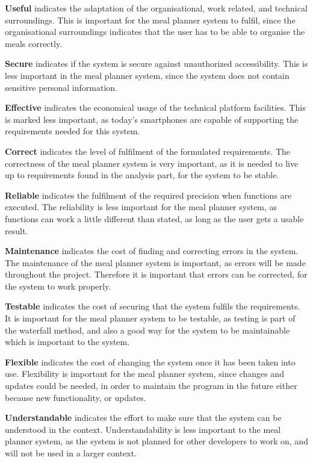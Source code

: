 \textbf{Useful} indicates the adaptation of the organisational, work related, and technical surroundings. This is important for the meal planner system to fulfil, since the organisational surroundings indicates that the user has to be able to organise the meals correctly.

\textbf{Secure} indicates if the system is secure against unauthorized accessibility. This is less important in the meal planner system, since the system does not contain sensitive personal information.

\textbf{Effective} indicates the economical usage of the technical platform facilities. This is marked less important, as today's smartphones are capable of supporting the requirements needed for this system.

\textbf{Correct} indicates the level of fulfilment of the formulated requirements. The correctness of the meal planner system is very important, as it is needed to live up to requirements found in the analysis part, for the system to be stable.

\textbf{Reliable} indicates the fulfilment of the required precision when functions are executed. The reliability is less important for the meal planner system, as functions can work a little different than stated, as long as the user gets a usable result.

\textbf{Maintenance} indicates the cost of finding and correcting errors in the system. The maintenance of the meal planner system is important, as errors will be made throughout the project. Therefore it is important that errors can be corrected, for the system to work properly.

\textbf{Testable} indicates the cost of securing that the system fulfils the requirements. It is important for the meal planner system to be testable, as testing is part of the waterfall method, and also a good way for the system to be maintainable which is important to the system.

\textbf{Flexible} indicates the cost of changing the system once it has been taken into use. Flexibility is important for the meal planner system, since changes and updates could be needed, in order to maintain the program in the future either because new functionality, or updates.

\textbf{Understandable} indicates the effort to make sure that the system can be understood in the context. Understandability is less important to the meal planner system, as the system is not planned for other developers to work on, and will not be used in a larger context.

